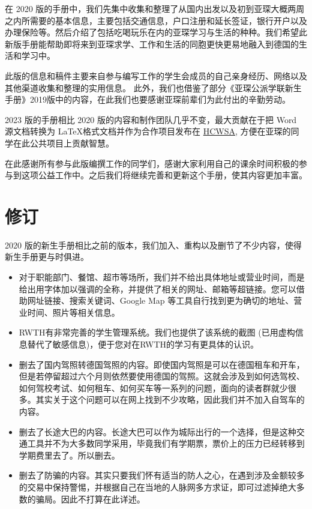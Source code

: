   在 2020 版的手册中，我们先集中收集和整理了从国内出发以及初到亚琛大概两周之内所需要的基本信息，主要包括交通信息，户口注册和延长签证，银行开户以及办理保险等。然后介绍了包括吃喝玩乐在内的亚琛学习与生活的种种。我们希望此新版手册能帮助即将来到亚琛求学、工作和生活的同胞更快更易地融入到德国的生活和学习中。

  此版的信息和稿件主要来自参与编写工作的学生会成员的自己亲身经历、网络以及其他渠道收集和整理的实用信息。 此外，我们也借鉴了部分《亚琛公派学联新生手册》2019版中的内容，在此我们也要感谢亚琛前辈们为此付出的辛勤劳动。

  2023 版的手册相比 2020 版的内容和制作团队几乎不变，最大贡献在于把 Word 源文档转换为 \LaTeX 格式文档并作为合作项目发布在 \href{https://github.com/OChicken/HCWSA}{HCWSA}, 方便在亚琛的同学在此公共项目上贡献智慧。

  在此感谢所有参与此版编撰工作的同学们，感谢大家利用自己的课余时间积极的参与到这项公益工作中。之后我们将继续完善和更新这个手册，使其内容更加丰富。



  \newpage

\chapter*{修订}


  2020 版的新生手册相比之前的版本，我们加入、重构以及删节了不少内容，使得新生手册更与时俱进。

  \begin{itemize}
    \item 对于职能部门、餐馆、超市等场所，我们并不给出具体地址或营业时间，而是给出用字体加以强调的全称，并提供了相关的网址、邮箱等超链接。您可以借助网址链接、搜索关键词、Google Map 等工具自行找到更为确切的地址、营业时间、照片等相关信息。
    \item RWTH有非常完善的学生管理系统。我们也提供了该系统的截图 (已用虚构信息替代了敏感信息)，便于您对在RWTH的学习有更具体的认识。
    \item 删去了国内驾照转德国驾照的内容。即使国内驾照是可以在德国租车和开车，但是若停留超过六个月则依然要使用德国的驾照。这就会涉及到如何选驾校、如何驾校考试、如何租车、如何买车等一系列的问题，面向的读者群就少很多。其实关于这个问题可以在网上找到不少攻略，因此我们并不加入自驾车的内容。
    \item 删去了长途大巴的内容。长途大巴可以作为城际出行的一个选择，但是这种交通工具并不为大多数同学采用，毕竟我们有学期票，票价上的压力已经转移到学期费里去了。所以删去。
    \item 删去了防骗的内容。其实只要我们怀有适当的防人之心，在遇到涉及金额较多的交易中保持警惕，并根据自己在当地的人脉网多方求证，即可过滤掉绝大多数的骗局。因此不打算在此详述。
  \end{itemize}

